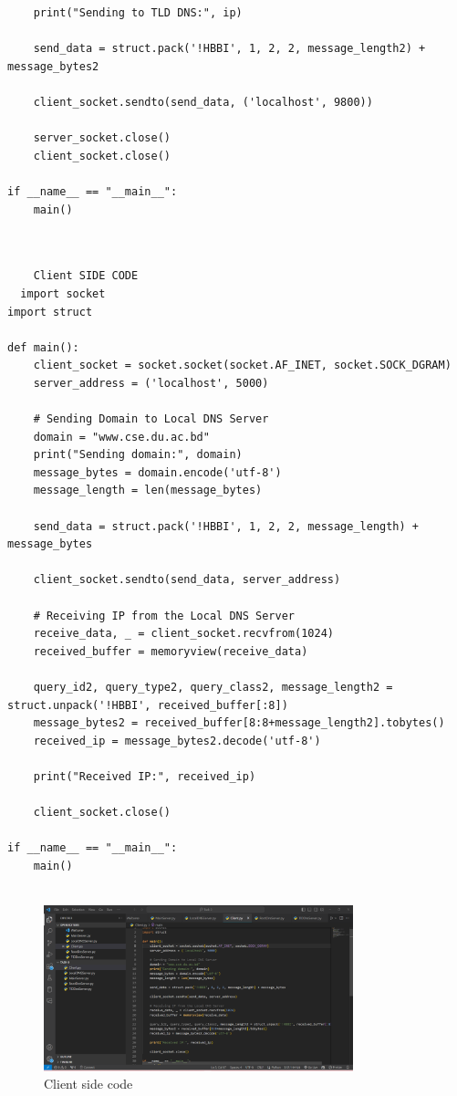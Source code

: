 \documentclass[11pt]{article}
\begin{document}
\begin{itemize}
\begin{itemize}
\begin{verbatim}
    print("Sending to TLD DNS:", ip)

    send_data = struct.pack('!HBBI', 1, 2, 2, message_length2) + message_bytes2

    client_socket.sendto(send_data, ('localhost', 9800))

    server_socket.close()
    client_socket.close()

if __name__ == "__main__":
    main()

   
\end{verbatim}
 \begin{verbatim}
    Client SIDE CODE
  import socket
import struct

def main():
    client_socket = socket.socket(socket.AF_INET, socket.SOCK_DGRAM)
    server_address = ('localhost', 5000)

    # Sending Domain to Local DNS Server
    domain = "www.cse.du.ac.bd"
    print("Sending domain:", domain)
    message_bytes = domain.encode('utf-8')
    message_length = len(message_bytes)

    send_data = struct.pack('!HBBI', 1, 2, 2, message_length) + message_bytes

    client_socket.sendto(send_data, server_address)

    # Receiving IP from the Local DNS Server
    receive_data, _ = client_socket.recvfrom(1024)
    received_buffer = memoryview(receive_data)

    query_id2, query_type2, query_class2, message_length2 = struct.unpack('!HBBI', received_buffer[:8])
    message_bytes2 = received_buffer[8:8+message_length2].tobytes()
    received_ip = message_bytes2.decode('utf-8')

    print("Received IP:", received_ip)

    client_socket.close()

if __name__ == "__main__":
    main()


\end{verbatim}


    \begin{figure}[H]
        \centering
        \includegraphics[width=0.8\textwidth]{client.png}
        \caption{Client side code}
        \label{fig:1}
    \end{figure}
    

\end{itemize}
\end{itemize}
\end{document}
